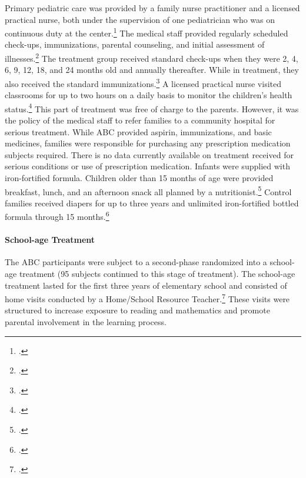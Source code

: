 \begin{appendices}
\noindent Primary pediatric care was provided by a family nurse practitioner and a licensed practical nurse, both under the supervision of one pediatrician who was on continuous duty at the center.\footnote{\citet{Haskins-et-al_1978_JoPP}.} The medical staff provided regularly scheduled check-ups, immunizations, parental counseling, and initial assessment of illnesses.\footnote{\citet{Ramey-et-al_1977_Intro-to-ABC}.} The treatment group received standard check-ups when they were 2, 4, 6, 9, 12, 18, and 24 months old and annually thereafter. While in treatment, they also received the standard immunizations.\footnote{\citet{Campbell_Conti_etal_2014_EarlyChildhoodInvestments}.} A licensed practical nurse visited classrooms for up to two hours on a daily basis to monitor the children's health status.\footnote{\citet{Sanyal_Henderson_etal_1980_JoPediatrics}.} This part of treatment was free of charge to the parents. However, it was the policy of the medical staff to refer families to a community hospital for serious treatment. While ABC provided aspirin, immunizations, and basic medicines, families were responsible for purchasing any prescription medication subjects required. There is no data currently available on treatment received for serious conditions or use of prescription medication.  Infants were supplied with iron-fortified formula. Children older than 15 months of age were provided breakfast, lunch, and an
afternoon snack all planned by a nutritionist.\footnote{\citet{Campbell_Conti_etal_2014_EarlyChildhoodInvestments,abc2014-2015interviews}.} Control families received diapers for up to three years and unlimited iron-fortified bottled formula through 15 months.\footnote{\citet{Ramey_Collier_etal_1976_CarolinaAbecedarianProject,Ramey_Campbell_1979_SR}.}

\paragraph{School-age Treatment}

\noindent The ABC participants were subject to a second-phase randomized into a school-age treatment (95 subjects continued to this stage of treatment). The school-age treatment lasted for the first three years of elementary school and consisted of home visits conducted by a Home/School Resource Teacher.\footnote{\cite{Burchinal_Campbell_etal_1997_CD}.} These visits were structured to increase exposure to reading and mathematics and promote parental involvement in the learning process.\\


\end{appendices}
